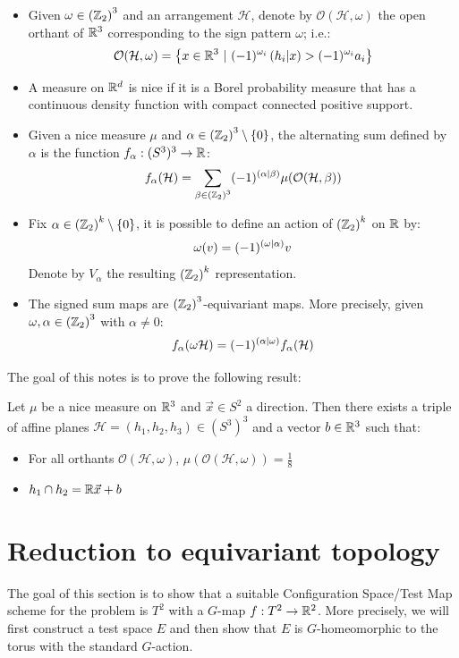 \documentclass[10pt]{article}
\begin{document}
\begin{itemize}
\[    \]
  \item Given $\omega \in \left(\mathbb{Z}_2\right)^3$ and an arrangement $\mathcal{H}$, denote by $\mathcal{O}(\mathcal{H}, \omega)$ the open orthant of $\mathbb{R}^3$ corresponding to the sign pattern $\omega$; i.e.:
    \[
      \mathcal{O}(\mathcal{H}, \omega) = \left\{ x\in \mathbb{R}^3 \  \vert \ (-1)^{\omega_i}\left( h_i \vert x\right) > (-1)^{\omega_i}a_i \right\}
    \]
  \item A measure on $\mathbb{R}^d$ is nice if it is a Borel probability measure that has a continuous density function with compact connected positive support.
  \item Given a nice measure $\mu$ and $\alpha \in \left(\mathbb{Z}_2\right)^3 \setminus \left\{0\right\}$, the alternating sum defined by $\alpha$ is the function $f_\alpha:(S^3)^3\rightarrow \mathbb{R}$:
    \[
      f_\alpha(\mathcal{H}) = \sum_{\beta\in \left(\mathbb{Z}_2\right)^3} (-1)^{\left( \alpha \vert \beta\right)}\mu(\mathcal{O}(\mathcal{H}, \beta))
    \]
  \item Fix $\alpha\in \left(\mathbb{Z}_2\right)^k\setminus \left\{0\right\}$, it is possible to define an action of $\left(\mathbb{Z}_2\right)^k$ on $\mathbb{R}$ by:
    \[
      \omega(v) = (-1)^{\left( \omega \vert \alpha\right)}v
    \]
    Denote by $V_\alpha$ the resulting $\left(\mathbb{Z}_2\right)^k$ representation.
  \item The signed sum maps are $\left(\mathbb{Z}_2\right)^3$-equivariant maps. More precisely, given $\omega, \alpha \in \left(\mathbb{Z}_2\right)^3$ with $\alpha \neq 0$:
    \[
      f_\alpha(\omega \mathcal{H}) = (-1)^{\left( \alpha \vert \omega\right)}f_\alpha(\mathcal{H})
    \]
\end{itemize}

The goal of this notes is to prove the following result:
\begin{theorem}
  Let $\mu$ be a nice measure on $\mathbb{R}^3$ and $\vec{x} \in S^2$ a direction. Then there exists a triple of affine planes $ \mathcal{H}=(h_1, h_2, h_3) \in (S^3)^3$ and a vector $b\in \mathbb{R}^3$ such that:
  \begin{itemize}
  \item For all orthants $\mathcal{O}(\mathcal{H}, \omega)$, $\mu(\mathcal{O}(\mathcal{H}, \omega)) = \frac{1}{8}$
  \item $h_1 \cap h_2 = \mathbb{R} \vec{x} + b$
  \end{itemize}
\end{theorem}

\section{Reduction to equivariant topology}\label{sec:torus_conf_space}
The goal of this section is to show that a suitable Configuration Space/Test Map scheme for the problem is $T^2$ with a $G$-map $f:T^2 \rightarrow \mathbb{R}^2$. More precisely, we will first construct a test space $E$ and then show that $E$ is $G$-homeomorphic to the torus with the standard $G$-action.
\end{document}
